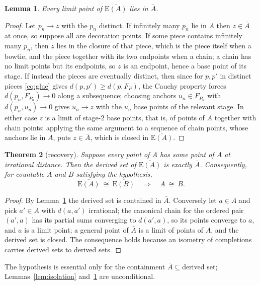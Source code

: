 \documentclass[11pt]{article}
\newtheorem{theorem}{Theorem}[section]
\newtheorem{lemma}[theorem]{Lemma}
\theoremstyle{definition}
\theoremstyle{remark}
\newcommand{\E}{\mathrm{E}}
\begin{document}
\begin{lemma}\label{lem:limits}
Every limit point of $\overline{\E(A)}$ lies in $\bar A$.
\end{lemma}

\begin{proof}
Let $p_n\to z$ with the $p_n$ distinct. If infinitely many $p_n$ lie in $A$ then
$z\in\bar A$ at once, so suppose all are decoration points. If some piece contains
infinitely many $p_n$, then $z$ lies in the closure of that piece, which is the piece
itself when a bowtie, and the piece together with its two endpoints when a chain; a chain
has no limit points but its endpoints, so $z$ is an endpoint, hence a base point of its
stage. If instead the pieces are eventually distinct, then since for $p,p'$ in distinct
pieces \eqref{eq:glue} gives $d(p,p')\ge d(p,F_P)$, the Cauchy property forces
$d(p_n,F_{P_n})\to0$ along a subsequence; choosing anchors $u_n\in F_{P_n}$ with
$d(p_n,u_n)\to0$ gives $u_n\to z$ with the $u_n$ base points of the relevant stage. In
either case $z$ is a limit of stage-2 base points, that is, of points of $A$ together with
chain points; applying the same argument to a sequence of chain points, whose anchors lie
in $A$, puts $z\in\bar A$, which is closed in $\overline{\E(A)}$.
\end{proof}

\begin{theorem}[recovery]\label{thm:recovery}
Suppose every point of $A$ has some point of $A$ at irrational distance. Then the derived
set of $\overline{\E(A)}$ is exactly $\bar A$. Consequently, for countable $A$ and $B$
satisfying the hypothesis,
\[
\overline{\E(A)}\ \cong\ \overline{\E(B)}
\quad\Longrightarrow\quad
\bar A\ \cong\ \bar B .
\]
\end{theorem}

\begin{proof}
By Lemma~\ref{lem:limits} the derived set is contained in $\bar A$. Conversely let
$a\in A$ and pick $a'\in A$ with $d(a,a')$ irrational; the canonical chain for the ordered
pair $(a',a)$ has its partial sums converging to $d(a',a)$, so its points converge to $a$,
and $a$ is a limit point; a general point of $\bar A$ is a limit of points of $A$, and the
derived set is closed. The consequence holds because an isometry of completions carries
derived sets to derived sets.
\end{proof}

The hypothesis is essential only for the containment $\bar A\subseteq{}$derived set;
Lemmas~\ref{lem:isolation} and~\ref{lem:limits} are unconditional.
\end{document}
